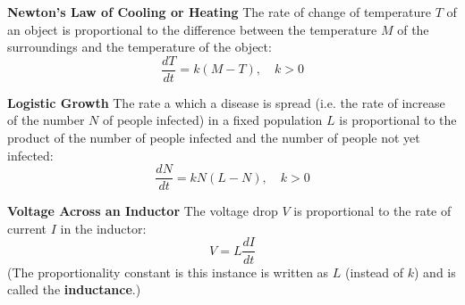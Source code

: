 \documentclass{beamer}
\begin{document}
\begin{frame}
\begin{example}
\textbf{Newton's Law of Cooling or Heating} The rate of change of temperature $T$ of an object is proportional to the difference between the temperature $M$ of the surroundings and the temperature of the object:
\begin{equation*}
\dfrac{dT}{dt}=k(M-T),\quad k>0
\end{equation*}
\end{example}\pause

\begin{example}
\textbf{Logistic Growth} The rate a which a disease is spread (i.e\@. the rate of increase of the number $N$ of people infected) in a fixed population $L$ is proportional to the product of the number of people infected and the number of people not yet infected:
\begin{equation*}
\dfrac{dN}{dt}=kN(L-N),\quad k>0
\end{equation*}
\end{example}
\end{frame}

\begin{frame}
\begin{example}
\textbf{Voltage Across an Inductor} The voltage drop $V$ is proportional to the rate of current $I$ in the inductor:
\begin{equation*}
V=L\dfrac{dI}{dt}
\end{equation*}
(The proportionality constant is this instance is written as $L$ (instead of $k$) and is called the \textbf{inductance}.)
\end{example}
\end{frame}
\end{document}

